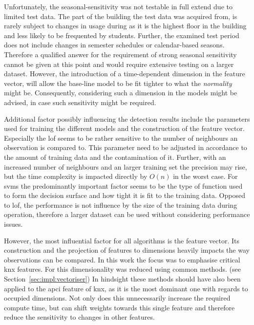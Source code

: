 Unfortunately, the seasonal-sensitivity was not testable in full extend due to limited test data.
The part of the building the test data was acquired from, is rarely subject to changes in usage during as it is the highest floor in the building and less likely to be frequented by students.
Further, the examined test period does not include changes in semester schedules or calendar-based seasons.
Therefore a qualified answer for the requirement of strong seasonal sensitivity cannot be given at this point and would require extensive testing on a larger dataset.
However, the introduction of a time-dependent dimension in the feature vector, will allow the base-line model to be fit tighter to what the \emph{normality} might be. Consequently, considering such a dimension in the models might be advised, in case such sensitivity might be required.

Additional factor possibly influencing the detection results include the parameters used for training the different models and the construction of the feature vector.
Especially the \gls{lof} seems to be rather sensitive to the number of neighbours an observation is compared to. This parameter need to be adjusted in accordance to the amount of training data and the contamination of it. Further, with an increased number of neighbours and an larger training set the precision may rise, but the time complexity is impacted directly by \(O(n)\) in the worst case.
For \glspl{svm} the predominantly important factor seems to be the type of function used to form the decision surface and how tight it is fit to the training data. Opposed to \gls{lof}, the performance is not influence by the size of the training data during operation, therefore a larger dataset can be used without considering performance issues.

However, the most influential factor for all algorithms is the feature vector.
Its construction and the projection of features to dimensions heavily impacts the way observations can be compared.
In this work the focus was to emphasise critical \gls{knx} features. For this dimensionality was reduced using common methods. (see Section~\ref{sec:impl:vectoriser}) In hindsight these methods should have also been applied to the \gls{apci} feature of \gls{knx}, as it is the most dominant one with regards to occupied dimensions. Not only does this unnecessarily increase the required compute time, but can shift weights towards this single feature and therefore reduce the sensitivity to changes in other features.	


